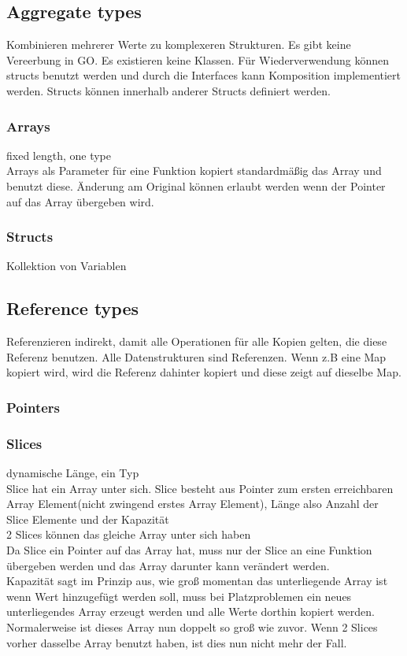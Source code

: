 \subsection{Aggregate types}
Kombinieren mehrerer Werte zu komplexeren Strukturen.
Es gibt keine Vereerbung in GO. Es existieren keine Klassen. Für Wiederverwendung können structs benutzt werden und durch die Interfaces kann Komposition implementiert werden. Structs können innerhalb anderer Structs definiert werden.
\subsubsection{Arrays}
fixed length, one type\\
Arrays als Parameter für eine Funktion kopiert standardmäßig das Array und benutzt diese. Änderung am Original können erlaubt werden wenn der Pointer auf das Array übergeben wird.
\subsubsection{Structs}
Kollektion von Variablen

\subsection{Reference types}
Referenzieren indirekt, damit alle Operationen für alle Kopien gelten, die diese Referenz benutzen. Alle Datenstrukturen sind Referenzen. Wenn z.B eine Map kopiert wird, wird die Referenz dahinter kopiert und diese zeigt auf dieselbe Map.
\subsubsection{Pointers}
\subsubsection{Slices}
dynamische Länge, ein Typ
\\Slice hat ein Array unter sich. Slice besteht aus Pointer zum ersten erreichbaren Array Element(nicht zwingend erstes Array Element), Länge also Anzahl der Slice Elemente und der Kapazität
\\2 Slices können das gleiche Array unter sich haben
\\Da Slice ein Pointer auf das Array hat, muss nur der Slice an eine Funktion übergeben werden und das Array darunter kann verändert werden.
\\Kapazität sagt im Prinzip aus, wie groß momentan das unterliegende Array ist
\\wenn Wert hinzugefügt werden soll, muss bei Platzproblemen ein neues unterliegendes Array erzeugt werden und alle Werte dorthin kopiert werden. Normalerweise ist dieses Array nun doppelt so groß wie zuvor. Wenn 2 Slices vorher dasselbe Array benutzt haben, ist dies nun nicht mehr der Fall.
